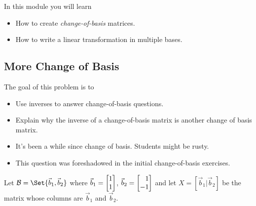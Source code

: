 \documentclass{problemset}
\newcommand{\bookonlynewpage}{\begin{bookonly}\newpage\end{bookonly}}
\begin{document}
\begin{module}

	In this module you will learn
	\begin{itemize}
		\item How to create \emph{change-of-basis} matrices.
		\item How to write a linear transformation in multiple bases.
	\end{itemize}

	
\end{module}
	\bookonlynewpage
\subsection*{More Change of Basis}
	\question
	\begin{annotation}
		\begin{goals}

			The goal of this problem is to
			\begin{itemize}
				\item Use inverses to answer change-of-basis questions.
				\item Explain why the inverse of a change-of-basis matrix is another
					change of basis matrix.
			\end{itemize}
		\end{goals}

		\begin{notes}
			\begin{itemize}
				\item It's been a while since change of basis. Students might be rusty.
				\item This question was foreshadowed in the initial change-of-basis exercises.
			\end{itemize}
		\end{notes}
	\end{annotation}
	Let $\mathcal B=\Set{\vec b_1,\vec b_2}$ where $\vec b_1=\mat{1\\1}$, $\vec b_2=\mat{1\\-1}$
	and let $X=[\vec b_1|\vec b_2]$ be the matrix whose columns are $\vec b_1$ and $\vec b_2$.
\end{document}
